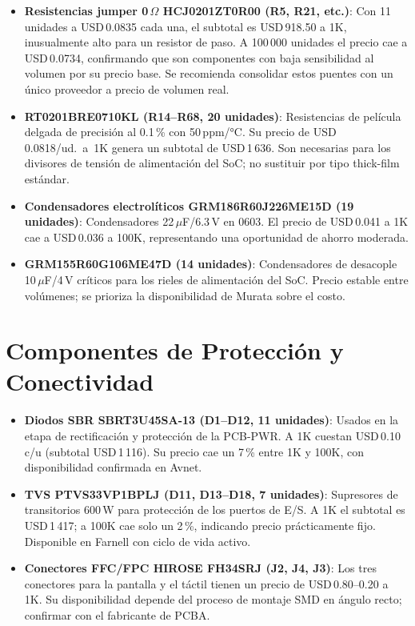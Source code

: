 \begin{itemize}
  \item \textbf{Resistencias jumper 0\,$\Omega$ HCJ0201ZT0R00 (R5, R21, etc.)}:
    Con 11 unidades a USD\,0.0835 cada una, el subtotal es USD\,918.50 a 1K,
    inusualmente alto para un resistor de paso. A 100\,000 unidades el precio
    cae a USD\,0.0734, confirmando que son componentes con baja sensibilidad
    al volumen por su precio base. Se recomienda consolidar estos puentes con
    un único proveedor a precio de volumen real.

  \item \textbf{RT0201BRE0710KL (R14--R68, 20 unidades)}: Resistencias de
    película delgada de precisión al 0.1\,\% con 50\,ppm/°C. Su precio de
    USD\,0.0818/ud.~a~1K genera un subtotal de USD\,1\,636. Son necesarias
    para los divisores de tensión de alimentación del SoC; no sustituir
    por tipo thick-film estándar.

  \item \textbf{Condensadores electrolíticos GRM186R60J226ME15D (19 unidades)}:
    Condensadores 22\,$\mu$F/6.3\,V en 0603. El precio de USD\,0.041 a 1K
    cae a USD\,0.036 a 100K, representando una oportunidad de ahorro moderada.

  \item \textbf{GRM155R60G106ME47D (14 unidades)}: Condensadores de
    desacople 10\,$\mu$F/4\,V críticos para los rieles de alimentación
    del SoC. Precio estable entre volúmenes; se prioriza la disponibilidad
    de Murata sobre el costo.
\end{itemize}

\section{Componentes de Protección y Conectividad}
\label{sec:bom_proteccion}

\begin{itemize}
  \item \textbf{Diodos SBR SBRT3U45SA-13 (D1--D12, 11 unidades)}: Usados
    en la etapa de rectificación y protección de la PCB-PWR. A 1K cuestan
    USD\,0.10 c/u (subtotal USD\,1\,116). Su precio cae un 7\,\% entre 1K y
    100K, con disponibilidad confirmada en Avnet.

  \item \textbf{TVS PTVS33VP1BPLJ (D11, D13--D18, 7 unidades)}: Supresores
    de transitorios 600\,W para protección de los puertos de E/S. A 1K el
    subtotal es USD\,1\,417; a 100K cae solo un 2\,\%, indicando precio
    prácticamente fijo. Disponible en Farnell con ciclo de vida activo.

  \item \textbf{Conectores FFC/FPC HIROSE FH34SRJ (J2, J4, J3)}: Los tres
    conectores para la pantalla y el táctil tienen un precio de
    USD\,0.80--0.20 a 1K. Su disponibilidad depende del proceso de montaje
    SMD en ángulo recto; confirmar con el fabricante de PCBA.
\end{itemize}

